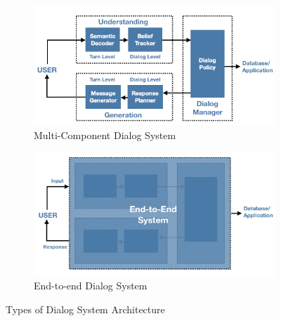\begin{figure}
\centering
\begin{subfigure}{\textwidth}
 \includegraphics[width=\linewidth]{assets/figures/dialog_system.png}
 \caption{Multi-Component Dialog System}\label{fig:systemfull}
\end{subfigure}

\vspace*{0.5in}

\begin{subfigure}{\textwidth}
 \includegraphics[width=\linewidth]{assets/figures/end2end.png}
 \caption{End-to-end Dialog System}\label{fig:end2end}
\end{subfigure}
\caption{Types of Dialog System Architecture}
\end{figure}

